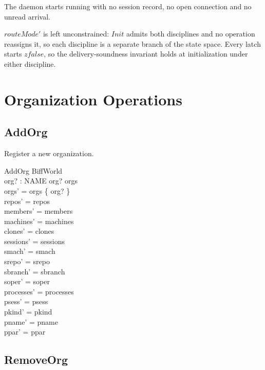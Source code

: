 \documentclass[a4paper,10pt,fleqn]{article}
\begin{document}
The daemon starts running with no session record, no open connection and
no unread arrival.

$routeMode'$ is left unconstrained: $Init$ admits both disciplines and no
operation reassigns it, so each discipline is a separate branch of the
state space.  Every latch starts $zfalse$, so the delivery-soundness
invariant holds at initialization under either discipline.

\section{Organization Operations}

\subsection{AddOrg}

Register a new organization.

\begin{schema}{AddOrg}
  \Delta BiffWorld \\
  org? : NAME
  \where
  org? \notin orgs \\
  orgs' = orgs \cup \{ org? \} \\
  repos' = repos \\
  members' = members \\
  machines' = machines \\
  clones' = clones \\
  sessions' = sessions \\
  smach' = smach \\
  srepo' = srepo \\
  sbranch' = sbranch \\
  soper' = soper \\
  processes' = processes \\
  psess' = psess \\
  pkind' = pkind \\
  pname' = pname \\
  ppar' = ppar
\end{schema}

\subsection{RemoveOrg}
\end{document}
